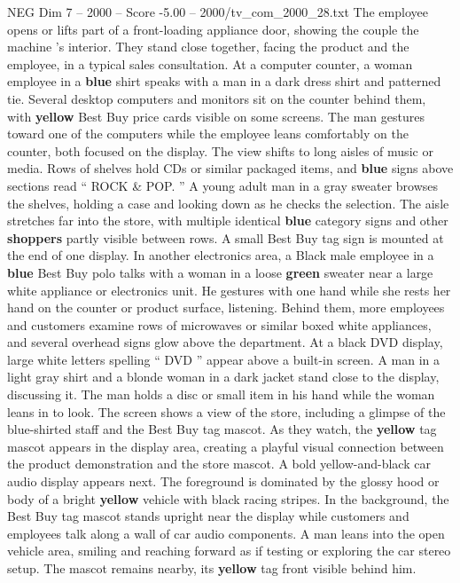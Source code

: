 \begin{textsample}{NEG Dim 7 – 2000 – Score -5.00 – 2000/tv\_com\_2000\_28.txt}
The employee opens or lifts part of a front-loading appliance door, showing the couple the machine ’s interior.
They stand close together, facing the product and the employee, in a typical sales consultation.
At a computer counter, a woman employee in a \textbf{blue} shirt speaks with a man in a dark dress shirt and patterned tie.
Several desktop computers and monitors sit on the counter behind them, with \textbf{yellow} Best Buy price cards visible on some screens.
The man gestures toward one of the computers while the employee leans comfortably on the counter, both focused on the display.
The view shifts to long aisles of music or media.
Rows of shelves hold CDs or similar packaged items, and \textbf{blue} signs above sections read “ ROCK \& POP. ” A young adult man in a gray sweater browses the shelves, holding a case and looking down as he checks the selection.
The aisle stretches far into the store, with multiple identical \textbf{blue} category signs and other \textbf{shoppers} partly visible between rows.
A small Best Buy tag sign is mounted at the end of one display.
In another electronics area, a Black male employee in a \textbf{blue} Best Buy polo talks with a woman in a loose \textbf{green} sweater near a large white appliance or electronics unit.
He gestures with one hand while she rests her hand on the counter or product surface, listening.
Behind them, more employees and customers examine rows of microwaves or similar boxed white appliances, and several overhead signs glow above the department.
At a black DVD display, large white letters spelling “ DVD ” appear above a built-in screen.
A man in a light gray shirt and a blonde woman in a dark jacket stand close to the display, discussing it.
The man holds a disc or small item in his hand while the woman leans in to look.
The screen shows a view of the store, including a glimpse of the blue-shirted staff and the Best Buy tag mascot.
As they watch, the \textbf{yellow} tag mascot appears in the display area, creating a playful visual connection between the product demonstration and the store mascot.
A bold yellow-and-black car audio display appears next.
The foreground is dominated by the glossy hood or body of a bright \textbf{yellow} vehicle with black racing stripes.
In the background, the Best Buy tag mascot stands upright near the display while customers and employees talk along a wall of car audio components.
A man leans into the open vehicle area, smiling and reaching forward as if testing or exploring the car stereo setup.
The mascot remains nearby, its \textbf{yellow} tag front visible behind him.

\end{textsample}
